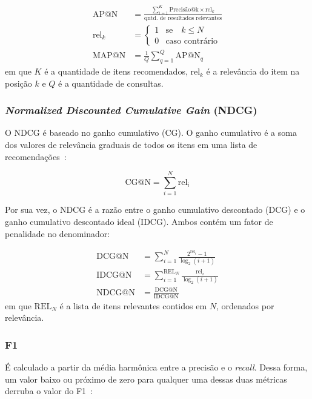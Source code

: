   \begin{align}
    \text{AP@N} &= \frac{\sum_{i = 1}^{K}\text{Precisão@k} \times \text{rel}_{k}}{\text{qntd. de resultados relevantes}} \\
    \text{rel}_k &= \begin{cases}
      1 & \text{se} \quad k \leq N \\
      0 & \text{caso contrário} 
    \end{cases} \\
    \text{MAP@N} &= \frac{1}{Q}\sum_{q = 1}^{Q} \text{AP@N}_{q}
  \end{align}
  em que $K$ é a quantidade de itens recomendados, $\text{rel}_{k}$ é a
  relevância do item na posição $k$ e $Q$ é a quantidade de consultas.

  \subsubsection{\textit{Normalized Discounted Cumulative Gain} (NDCG)}
  O NDCG é baseado no ganho cumulativo (CG). O ganho cumulativo é a soma dos
  valores de relevância graduais de todos os itens em uma lista de
  recomendações~\cite{carnevali2023offline}:

  \begin{equation}
    \text{CG@N} = \sum_{i = 1}^{N} \text{rel}_{i}
  \end{equation}
  
  Por sua vez, o NDCG é a razão entre o ganho cumulativo
  descontado (DCG) e o ganho cumulativo descontado ideal (IDCG). Ambos contém
  um fator de penalidade no denominador:

  \begin{align}
    \text{DCG@N} &= \sum_{i = 1}^{N} \frac{2^{\text{rel}_{i}} - 1}{\log_{2}(i + 1)} \\
    \text{IDCG@N} &= \sum_{i = 1}^{\text{REL}_N} \frac{\text{rel}_{i}}{{\log_{2}(i + 1)}} \\
    \text{NDCG@N} &= \frac{\text{DCG@N}}{\text{IDCG@N}}
  \end{align}
  em que $\text{REL}_N$ é a lista de itens relevantes contidos em $N$, ordenados
  por relevância.


  \subsubsection{F1}
É calculado a partir da média harmônica entre a precisão e o \textit{recall}. Dessa forma,
um valor baixo ou próximo de zero para qualquer uma dessas duas métricas derruba
o valor do F1~\cite{sessionbaseddp}:

